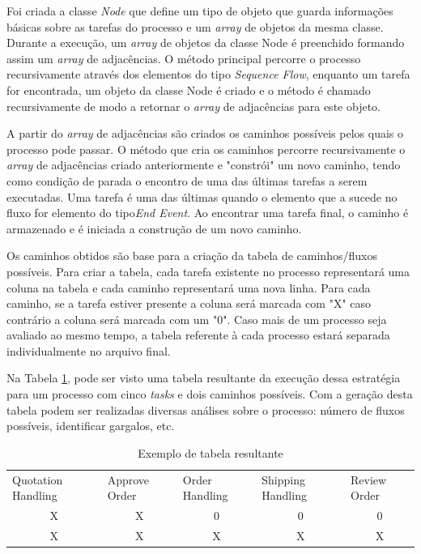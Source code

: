 \documentclass[12pt]{article}
\begin{document}
Foi criada a classe \emph{Node} que define um tipo de objeto que guarda informações básicas sobre as tarefas do processo e um \emph{array} de objetos da mesma classe. Durante a execução, um \emph{array} de objetos da classe Node é preenchido formando assim um \emph{array} de adjacências. O método principal percorre o processo recursivamente através dos elementos do tipo \emph{Sequence Flow}, enquanto um tarefa for encontrada, um objeto da classe Node é criado e o método é chamado recursivamente de modo a retornar o \emph{array} de adjacências para este objeto.

A partir do \emph{array} de adjacências são criados os caminhos possíveis pelos quais o processo pode passar. O método que cria os caminhos percorre recursivamente o \emph{array} de adjacências criado anteriormente e "constrói" um novo caminho, tendo como condição de parada o encontro de uma das últimas tarefas a serem executadas. Uma tarefa é uma das últimas quando o elemento que a sucede no fluxo for elemento do tipo\emph{End Event}. Ao encontrar uma tarefa final, o caminho é armazenado e é iniciada a construção de um novo caminho.

Os caminhos obtidos são base para a criação da tabela de caminhos/fluxos possíveis. Para criar a tabela, cada tarefa existente no processo representará uma coluna na tabela e cada caminho representará uma nova linha. Para cada caminho, se a tarefa estiver presente a coluna será marcada com "X" caso contrário a coluna será marcada com um "0". Caso mais de um processo seja avaliado ao mesmo tempo, a tabela referente à cada processo estará separada individualmente no arquivo final. 

Na Tabela \ref{tab:exemplo}, pode ser visto uma tabela resultante da execução dessa estratégia para um processo com cinco \emph{tasks} e dois caminhos possíveis. Com a geração desta tabela podem ser realizadas diversas análises sobre o processo: número de fluxos possíveis, identificar gargalos, etc.

\begin{table}[]
\centering
\caption{Exemplo de tabela resultante}
\label{tab:exemplo}
\begin{tabular}{ccccc}
\multicolumn{1}{l}{Quotation Handling} & \multicolumn{1}{l}{Approve Order} & \multicolumn{1}{l}{Order Handling} & \multicolumn{1}{l}{Shipping Handling} & \multicolumn{1}{l}{Review Order} \\
X & X & 0 & 0 & 0 \\
X & X & X & X & X
\end{tabular}
\end{table}
\end{document}
